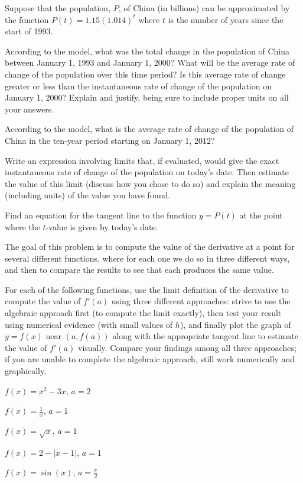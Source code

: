 \begin{exercises}
\item Suppose that the population, $P$, of China (in billions) can be approximated by the function $P(t) = 1.15(1.014)^t$ where $t$ is the number of years since the start of 1993.
   \ba
   	\item According to the model, what was the total change in the population of China between January 1, 1993 and January 1, 2000?  What will be the average rate of change of the population over this time period?  Is this average rate of change greater or less than the instantaneous rate of change of the population on January 1, 2000?  Explain and justify, being sure to include proper units on all your answers.
	\item According to the model, what is the average rate of change of the population of China in the ten-year period starting on January 1, 2012?
	\item Write an expression involving limits that, if evaluated, would give the exact instantaneous rate of change of the population on today's date.  Then estimate the value of this limit (discuss how you chose to do so) and explain the meaning (including units) of the value you have found.
	\item Find an equation for the tangent line to the function $y = P(t)$ at the point where the $t$-value is given by today's date.  
   \ea

\item The goal of this problem is to compute the value of the derivative at a point for several different functions, where for each one we do so in three different ways, and then to compare the results to see that each produces the same value.

For each of the following functions, use the limit definition of the derivative to compute the value of $f'(a)$ using three different approaches:  strive to use the algebraic approach first (to compute the limit exactly), then test your result using numerical evidence (with small values of $h$), and finally plot the graph of $y = f(x)$ near $(a,f(a))$ along with the appropriate tangent line to estimate the value of $f'(a)$ visually.  Compare your findings among all three approaches; if you are unable to complete the algebraic approach, still work numerically and graphically.

	\ba
		\item $f(x) = x^2 - 3x$, $a = 2$
		\item $f(x) = \frac{1}{x}$, $a = 1$
		\item $f(x) = \sqrt{x}$, $a = 1$
		\item $f(x) = 2 - |x-1|$, $a = 1$
		\item $f(x) = \sin(x)$, $a = \frac{\pi}{2}$
	\ea

\end{exercises}
\afterexercises